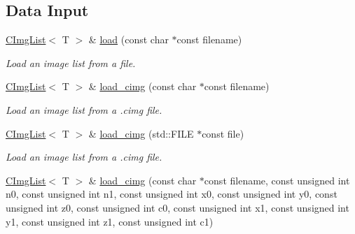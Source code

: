 \subsection*{Data Input}
\label{_amgrpb77bbd177ec1e4d71a0fe96d3d4e8b39}
 \begin{DoxyCompactItemize}
\item 
\hypertarget{structcimg__library_1_1CImgList_a8ee71f92f35cc9e24d9d3a09456be2ae}{
\hyperlink{structcimg__library_1_1CImgList}{CImgList}$<$ T $>$ \& \hyperlink{structcimg__library_1_1CImgList_a8ee71f92f35cc9e24d9d3a09456be2ae}{load} (const char $\ast$const filename)}
\label{structcimg__library_1_1CImgList_a8ee71f92f35cc9e24d9d3a09456be2ae}

\begin{DoxyCompactList}\small\item\em Load an image list from a file. \item\end{DoxyCompactList}\item 
\hypertarget{structcimg__library_1_1CImgList_ab3fe1de8da57902ded527ce43e27b72c}{
\hyperlink{structcimg__library_1_1CImgList}{CImgList}$<$ T $>$ \& \hyperlink{structcimg__library_1_1CImgList_ab3fe1de8da57902ded527ce43e27b72c}{load\_\-cimg} (const char $\ast$const filename)}
\label{structcimg__library_1_1CImgList_ab3fe1de8da57902ded527ce43e27b72c}

\begin{DoxyCompactList}\small\item\em Load an image list from a .cimg file. \item\end{DoxyCompactList}\item 
\hypertarget{structcimg__library_1_1CImgList_ad40ae65add913bd02bcd7d9914e89cf3}{
\hyperlink{structcimg__library_1_1CImgList}{CImgList}$<$ T $>$ \& \hyperlink{structcimg__library_1_1CImgList_ad40ae65add913bd02bcd7d9914e89cf3}{load\_\-cimg} (std::FILE $\ast$const file)}
\label{structcimg__library_1_1CImgList_ad40ae65add913bd02bcd7d9914e89cf3}

\begin{DoxyCompactList}\small\item\em Load an image list from a .cimg file. \item\end{DoxyCompactList}\item 
\hypertarget{structcimg__library_1_1CImgList_adb13804029e8e95abe9860efc05b52f8}{
\hyperlink{structcimg__library_1_1CImgList}{CImgList}$<$ T $>$ \& \hyperlink{structcimg__library_1_1CImgList_adb13804029e8e95abe9860efc05b52f8}{load\_\-cimg} (const char $\ast$const filename, const unsigned int n0, const unsigned int n1, const unsigned int x0, const unsigned int y0, const unsigned int z0, const unsigned int c0, const unsigned int x1, const unsigned int y1, const unsigned int z1, const unsigned int c1)}
\label{structcimg__library_1_1CImgList_adb13804029e8e95abe9860efc05b52f8}


\end{DoxyCompactItemize}
